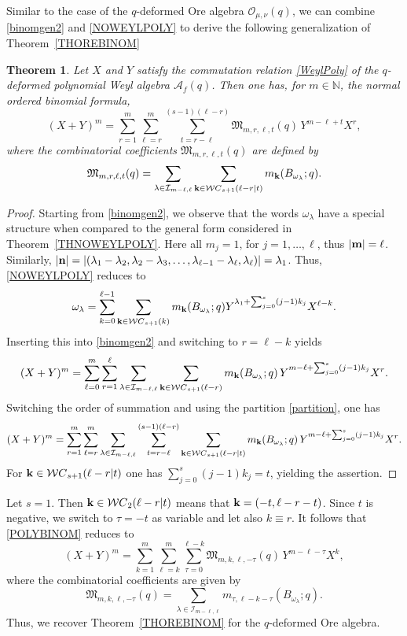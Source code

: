 \documentclass[10pt]{amsart}
\newtheorem{theorem}{Theorem}[section]%
\begin{document}
Similar to the case of the $q$-deformed Ore algebra ${\mathcal O}_{\mu,\nu}(q)$, we can combine \eqref{binomgen2} and \eqref{NOWEYLPOLY} to derive the following generalization of Theorem~\ref{THOREBINOM}
\begin{theorem}\label{THPOLYBINOM} Let $X$ and $Y$ satisfy the commutation relation \eqref{WeylPoly} of the $q$-deformed polynomial Weyl algebra ${\mathcal A}_{f}(q)$. Then one has, for $m\in \mathbb{N}$, the normal ordered binomial formula,
\begin{equation}\label{POLYBINOM}
(X+Y)^m=\sum_{r=1}^{m}\sum_{\ell=r}^m   \sum_{t=r-\ell}^{(s-1)(\ell -r)}  {\mathfrak M}_{m,r,\ell,t}(q) \, Y^{m-\ell+t} X^{r},
\end{equation}
where the combinatorial coefficients ${\mathfrak M}_{m,r,\ell,t}(q)$ are defined by
$$
{\mathfrak M}_{m,r,\ell,t}(q)=\sum_{\lambda \in \mathcal{I}_{m-\ell,\ell}} \sum_{{\bf k} \in {\mathcal WC}_{s+1}(\ell -r|t)} m_{{\bf k}}(B_{\omega_{\lambda}};q). 
$$
\end{theorem}
\begin{proof}
Starting from \eqref{binomgen2}, we observe that the words $\omega_{\lambda}$ have a special structure when compared to the general form considered in Theorem~\ref{THNOWEYLPOLY}. Here all $m_j=1$, for $j=1,\ldots,\ell$, thus $|{\bf m}|=\ell$. Similarly, $|{\bf n}|=|(\lambda_1-\lambda_2,\lambda_2-\lambda_3,\ldots,\lambda_{\ell-1}-\lambda_{\ell},\lambda_{\ell} )|=\lambda_1$. Thus, \eqref{NOWEYLPOLY} reduces to 
$$
\omega_{\lambda} =\sum_{k=0}^{\ell -1} \sum_{{\bf k} \in {\mathcal WC}_{s+1}(k)} m_{{\bf k}}(B_{\omega_{\lambda}};q) Y^{\lambda_1+\sum_{j=0}^s (j-1)k_j} X^{\ell - k}.
$$
Inserting this into \eqref{binomgen2} and switching to $r=\ell -k$ yields
$$
(X+Y)^m=\sum_{\ell=0}^m \sum_{r=1}^{\ell} \sum_{\lambda \in \mathcal{I}_{m-\ell,\ell}}  \sum_{{\bf k} \in {\mathcal WC}_{s+1}(\ell -r)} m_{{\bf k}}(B_{\omega_{\lambda}};q) \, Y^{m-\ell+\sum_{j=0}^s (j-1)k_j} X^{r}.
$$
Switching the order of summation and using the partition \eqref{partition}, one has
$$
(X+Y)^m=\sum_{r=1}^{m}\sum_{\ell=r}^m  \sum_{\lambda \in \mathcal{I}_{m-\ell,\ell}}  \sum_{t=r-\ell}^{(s-1)(\ell -r)}\sum_{{\bf k} \in {\mathcal WC}_{s+1}(\ell -r|t)} m_{{\bf k}}(B_{\omega_{\lambda}};q) \, Y^{m-\ell+\sum_{j=0}^s (j-1)k_j} X^{r}.
$$
For ${\bf k} \in {\mathcal WC}_{s+1}(\ell -r|t)$ one has $\sum_{j=0}^s (j-1)k_j=t$, yielding the assertion.  
\end{proof}
Let $s=1$. Then ${\bf k}\in {\mathcal WC}_{2}(\ell -r|t)$ means that ${\bf k}=(-t,\ell-r-t)$. Since $t$ is negative, we switch to $\tau =-t$ as variable and let also $k\equiv r$. It follows that \eqref{POLYBINOM} reduces to
$$
(X+Y)^m=\sum_{k=1}^{m}\sum_{\ell=k}^m   \sum_{\tau =0}^{\ell -k}  {\mathfrak M}_{m,k,\ell,-\tau}(q) \, Y^{m-\ell-\tau} X^{k},
$$
where the combinatorial coefficients are given by
$$
 {\mathfrak M}_{m,k,\ell,-\tau}(q)=\sum_{\lambda \in \mathcal{I}_{m-\ell,\ell}} m_{\tau,\ell-k-\tau}(B_{\omega_{\lambda}};q).
$$
Thus, we recover Theorem~\ref{THOREBINOM} for the $q$-deformed Ore algebra.
\end{document}

